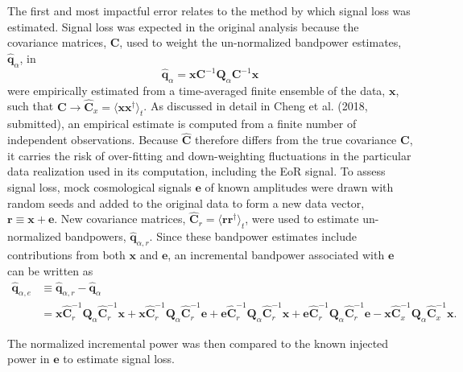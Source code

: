 \documentclass[onecolumn]{emulateapj} \shorttitle{}
\newcommand{\chengcitet}{\textrm{Cheng et al. (2018, submitted)}}
\begin{document}
The first and most impactful error relates to the method by which signal loss was estimated.
Signal loss was expected in the original analysis because the covariance matrices, $\textbf{C}$,
used to weight the un-normalized bandpower estimates, ${\widehat{\textbf{q}}}_\alpha$, in
\begin{equation}
{\widehat{\textbf{q}}}_{\alpha} = {\mathbf x}\textbf{C}^{-1}\textbf{Q}_\alpha \textbf{C}^{-1}{\mathbf x}
\end{equation} 
were empirically estimated from a time-averaged finite ensemble of the data, $\mathbf x$, such that $\mathbf{C}\rightarrow \widehat{\textbf{C}}_{x}=\langle {\mathbf x} {\mathbf x}^\dagger\rangle_{t}$. As discussed in detail in \chengcitet, an empirical estimate is computed from a finite number of independent observations. Because $\widehat{\textbf{C}}$ therefore differs from the true covariance $\textbf{C}$, it carries the risk of over-fitting and down-weighting fluctuations in the particular data realization used in its computation, including the EoR signal.
To assess signal loss, mock cosmological signals $\mathbf e$ of known amplitudes were 
drawn with random seeds and added to the original data to form a new data vector, ${\mathbf r}\equiv{\mathbf x} + {\mathbf e}$.
New covariance matrices, $\widehat{\textbf{C}}_r=\langle{\mathbf r}\mathbf{r}^\dagger\rangle_{t}$, were used to estimate un-normalized bandpowers, 
${\widehat{\textbf{q}}}_{\alpha,r}$. Since these bandpower estimates include contributions from both $\mathbf x$ and $\mathbf e$,
an incremental bandpower associated with $\mathbf e$ can be written as
\begin{align}
{\widehat{\textbf{q}}}_{\alpha,e}&\equiv{\widehat{\textbf{q}}}_{\alpha,r}-{\widehat{\textbf{q}}}_{\alpha} \\
&=
{\mathbf x}\widehat{\textbf{C}}_r^{-1}\textbf{Q}_\alpha \widehat{\textbf{C}}_r^{-1}{\mathbf x}+
{\mathbf x}\widehat{\textbf{C}}_r^{-1}\textbf{Q}_\alpha \widehat{\textbf{C}}_r^{-1}{\mathbf e}+
{\mathbf e}\widehat{\textbf{C}}_r^{-1}\textbf{Q}_\alpha \widehat{\textbf{C}}_r^{-1}{\mathbf x}+
{\mathbf e}\widehat{\textbf{C}}_r^{-1}\textbf{Q}_\alpha \widehat{\textbf{C}}_r^{-1}{\mathbf e}
- {\mathbf x}\widehat{\textbf{C}}_x^{-1}\textbf{Q}_\alpha \widehat{\textbf{C}}_x^{-1}{\mathbf x}.
\label{eq:crossterms}
\end{align}

\noindent The normalized incremental power was then compared to the known injected power in $\mathbf e$ to estimate signal loss.
\end{document}
